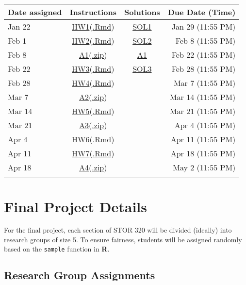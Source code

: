 \documentclass[
]{article}
\begin{document}
\begin{longtable}[]{@{}lccr@{}}
\toprule
Date assigned & Instructions & Solutions & Due Date
(Time)\tabularnewline
\midrule
\endhead
Jan 22 &
\href{Homework/HW-1.html}{HW1}(\href{Homework/HW\%201.rmd}{.Rmd}) &
\href{Solutions/HW1_Solution.html}{SOL1} & Jan 29 (11:55
PM)\tabularnewline
Feb 1 &
\href{Homework/HW-2.html}{HW2}(\href{Homework/HW\%202.rmd}{.Rmd}) &
\href{Solutions/HW2_Solution.html}{SOL2} & Feb 8 (11:55
PM)\tabularnewline
Feb 8 &
\href{Homework/Analysis\%201/Analysis-1.html}{A1}(\href{Homework/Analysis\%201/Analysis\%201.zip}{.zip})
& \href{Solutions/Analysis-1_Sol.html}{A1} & Feb 22 (11:55
PM)\tabularnewline
Feb 22 &
\href{Homework/HW-3.html}{HW3}(\href{Homework/HW\%203.rmd}{.Rmd}) &
\href{Solutions/HW3_Solution.html}{SOL3} & Feb 28 (11:55
PM)\tabularnewline
Feb 28 &
\href{Homework/HW-4.html}{HW4}(\href{Homework/HW\%204.rmd}{.Rmd}) & &
Mar 7 (11:55 PM)\tabularnewline
Mar 7 &
\href{Homework/Analysis\%202/Analysis_2.html}{A2}(\href{https://drive.google.com/file/d/1lop1deCM_s5r7aaPqoa1uQtZdC3SyMBi/view?usp=sharing}{.zip})
& & Mar 14 (11:55 PM)\tabularnewline
Mar 14 &
\href{Homework/HW-5.html}{HW5}(\href{Homework/HW\%205.rmd}{.Rmd}) & &
Mar 21 (11:55 PM)\tabularnewline
Mar 21 &
\href{Homework/Analysis\%203/Analysis-3.html}{A3}(\href{Homework/Analysis\%203/Analysis\%203.zip}{.zip})
& & Apr 4 (11:55 PM)\tabularnewline
Apr 4 &
\href{Homework/HW-6.html}{HW6}(\href{Homework/HW\%206.rmd}{.Rmd}) & &
Apr 11 (11:55 PM)\tabularnewline
Apr 11 &
\href{Homework/HW-7.html}{HW7}(\href{Homework/HW\%207.rmd}{.Rmd}) & &
Apr 18 (11:55 PM)\tabularnewline
Apr 18 &
\href{Homework/Analysis\%204/Analysis-4.html}{A4}(\href{Homework/Analysis\%204/Analysis\%204.zip}{.zip})
& & May 2 (11:55 PM)\tabularnewline
& & &\tabularnewline
\bottomrule
\end{longtable}

\hypertarget{final-project-details}{%
\section{\texorpdfstring{\textbf{Final Project
Details}}{Final Project Details}}\label{final-project-details}}

For the final project, each section of STOR 320 will be divided
(ideally) into research groups of size 5. To ensure fairness, students
will be assigned randomly based on the \texttt{sample} function in
\textbf{R}.

\hypertarget{research-group-assignments}{%
\subsection{Research Group
Assignments}\label{research-group-assignments}}
\end{document}

